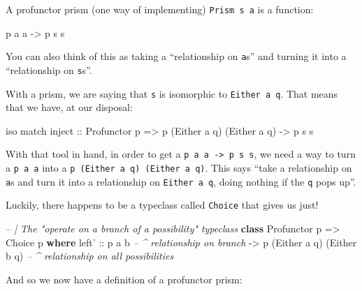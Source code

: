 \documentclass[]{article}
\newenvironment{Shaded}{}{}
\newcommand{\CommentTok}[1]{\textcolor[rgb]{0.38,0.63,0.69}{\textit{#1}}}
\newcommand{\DataTypeTok}[1]{\textcolor[rgb]{0.56,0.13,0.00}{#1}}
\newcommand{\KeywordTok}[1]{\textcolor[rgb]{0.00,0.44,0.13}{\textbf{#1}}}
\newcommand{\NormalTok}[1]{#1}
\newcommand{\OtherTok}[1]{\textcolor[rgb]{0.00,0.44,0.13}{#1}}
\begin{document}
A profunctor prism (one way of implementing)
\texttt{Prism\textquotesingle{}\ s\ a} is a function:

\begin{Shaded}
\begin{Highlighting}[]
\NormalTok{p a a }\OtherTok{->}\NormalTok{ p s s}
\end{Highlighting}
\end{Shaded}

You can also think of this as taking a ``relationship on \texttt{a}s'' and
turning it into a ``relationship on \texttt{s}s''.

With a prism, we are saying that \texttt{s} is isomorphic to
\texttt{Either\ a\ q}. That means that we have, at our disposal:

\begin{Shaded}
\begin{Highlighting}[]
\NormalTok{iso match inject}
\OtherTok{    ::} \DataTypeTok{Profunctor}\NormalTok{ p}
    \OtherTok{=>}\NormalTok{ p (}\DataTypeTok{Either}\NormalTok{ a q) (}\DataTypeTok{Either}\NormalTok{ a q)}
    \OtherTok{->}\NormalTok{ p s s}
\end{Highlighting}
\end{Shaded}

With that tool in hand, in order to get a
\texttt{p\ a\ a\ -\textgreater{}\ p\ s\ s}, we need a way to turn a
\texttt{p\ a\ a} into a \texttt{p\ (Either\ a\ q)\ (Either\ a\ q)}. This says
``take a relationship on \texttt{a}s and turn it into a relationship on
\texttt{Either\ a\ q}, doing nothing if the \texttt{q} pops up''.

Luckily, there happens to be a typeclass called \texttt{Choice} that gives us
just!

\begin{Shaded}
\begin{Highlighting}[]
\CommentTok{-- | The "operate on a branch of a possibility" typeclass}
\KeywordTok{class} \DataTypeTok{Profunctor}\NormalTok{ p }\OtherTok{=>} \DataTypeTok{Choice}\NormalTok{ p }\KeywordTok{where}
\NormalTok{    left'}
\OtherTok{        ::}\NormalTok{ p a b                        }\CommentTok{-- ^ relationship on branch}
        \OtherTok{->}\NormalTok{ p (}\DataTypeTok{Either}\NormalTok{ a q) (}\DataTypeTok{Either}\NormalTok{ b q)  }\CommentTok{-- ^ relationship on all possibilities}
\end{Highlighting}
\end{Shaded}

And so we now have a definition of a profunctor prism:
\end{document}
